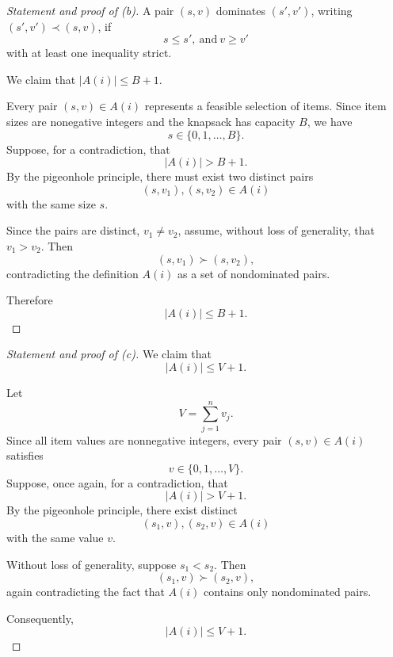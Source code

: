 \documentclass[11pt]{article}
\begin{document}
\begin{proof}[Statement and proof of (b)]
    A pair $(s,v)$ dominates $(s',v')$, writing 
    $(s',v') \prec (s,v)$, if 
    \[
        s \leq s', \ \text{and} \ v \geq v' 
    \]
    with at least one inequality strict. 

    We claim that $|A(i)| \leq B + 1$. 

    Every pair $(s,v) \in A(i)$ represents a feasible 
    selection of items. Since item sizes are 
    nonegative integers and the knapsack has 
    capacity $B$, we have 
    \[
        s \in \{0,1,\ldots, B\}. 
    \]
    Suppose, for a contradiction, that 
    \[
        |A(i)| > B + 1. 
    \]
    By the pigeonhole principle, there must 
    exist two distinct pairs 
    \[
        (s, v_1), (s, v_2) \in A(i)
    \]
    with the same size $s$. 

    Since the pairs are distinct, $v_1 \neq v_2$, 
    assume, without loss of generality, that 
    $v_1 > v_2$. Then 
    \[
        (s,v_1) \succ (s, v_2), 
    \]
    contradicting the definition $A(i)$ as 
    a set of nondominated pairs. 

    Therefore 
    \[
        |A(i)| \leq B + 1.
    \]
\end{proof}
\begin{proof}[Statement and proof of (c)]
    We claim that 
    \[
        |A(i)| \leq V + 1. 
    \]
    
    Let 
    \[
        V = \sum_{j=1}^n v_j. 
    \]
    Since all item values are nonnegative integers, 
    every pair $(s,v) \in A(i)$ satisfies 
    \[
        v \in \{0,1,\ldots,V\}. 
    \] 
    Suppose, once again, for a contradiction, that 
    \[
        |A(i)| > V + 1. 
    \]
    By the pigeonhole principle, there exist distinct 
    \[
        (s_1,v), (s_2, v) \in A(i)
    \]
    with the same value $v$. 

    Without loss of generality, suppose $s_1 < s_2$. 
    Then 
    \[
        (s_1,v) \succ (s_2,v), 
    \]
    again contradicting the fact that $A(i)$ contains 
    only nondominated pairs. 

    Consequently, 
    \[
        |A(i)| \leq V + 1. 
    \]
\end{proof}
\end{document}
